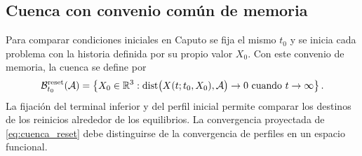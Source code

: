 \ifHAFOBasinMaterial
\subsection{Cuenca con convenio común de memoria}

Para comparar condiciones iniciales en Caputo se fija el mismo \(t_0\) y se
inicia cada problema con la historia definida por su propio valor \(X_0\).
Con este convenio de memoria, la cuenca se define por
\begin{equation}
\mathcal B_{t_0}^{\mathrm{reset}}(\mathcal A)=
\left\{
X_0\in\mathbb{R}^3:
\operatorname{dist}\bigl(X(t;t_0,X_0),\mathcal A\bigr)\to0
\ \text{cuando}\ t\to\infty
\right\}.
\label{eq:cuenca_reset}
\end{equation}
La fijación del terminal inferior y del perfil inicial permite comparar los
destinos de los reinicios alrededor de los equilibrios. La convergencia
proyectada de \cref{eq:cuenca_reset} debe distinguirse de la convergencia
de perfiles en un espacio funcional.
\fi
\fi
\endgroup
\fi
